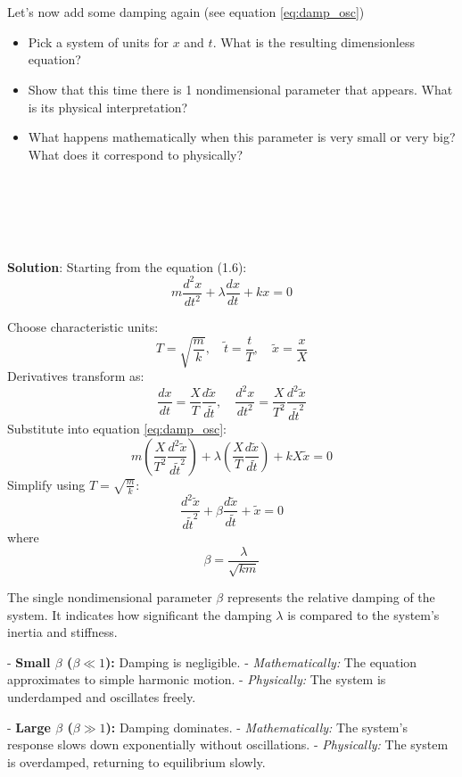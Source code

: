 \\
\\
 Let's now add some damping again (see equation \ref{eq:damp_osc})
\begin{itemize}
    \item Pick a system of units for $x$ and $t$. What is the resulting dimensionless equation? 
    \item Show that this time there is 1 nondimensional parameter that appears. What is its physical interpretation?
    \item What happens mathematically when this parameter is very small or very big? What  does it correspond to physically?
\end{itemize}
\\
\\
\\
\\
{\color{red} {\bf Solution}:
Starting from the equation (1.6):
\begin{equation}
    m \frac{d^2 x}{dt^2} + \lambda \frac{dx}{dt} + k x = 0 \label{eq:damp_osc}
\end{equation}

Choose characteristic units:
\[
    T = \sqrt{\frac{m}{k}}, \quad \tilde{t} = \frac{t}{T}, \quad \tilde{x} = \frac{x}{X}
\]
Derivatives transform as:
\[
    \frac{dx}{dt} = \frac{X}{T} \frac{d\tilde{x}}{d\tilde{t}}, \quad \frac{d^2 x}{dt^2} = \frac{X}{T^2} \frac{d^2\tilde{x}}{d\tilde{t}^2}
\]
Substitute into equation \eqref{eq:damp_osc}:
\[
    m \left( \frac{X}{T^2} \frac{d^2\tilde{x}}{d\tilde{t}^2} \right) + \lambda \left( \frac{X}{T} \frac{d\tilde{x}}{d\tilde{t}} \right) + kX \tilde{x} = 0
\]
Simplify using $T = \sqrt{\frac{m}{k}}$:
\[
    \frac{d^2\tilde{x}}{d\tilde{t}^2} + \beta \frac{d\tilde{x}}{d\tilde{t}} + \tilde{x} = 0
\]
where
\[
    \beta = \frac{\lambda}{\sqrt{k m}}
\]

The single nondimensional parameter $\beta$ represents the relative damping of the system. It indicates how significant the damping $\lambda$ is compared to the system's inertia and stiffness.

- \textbf{Small $\beta$ ($\beta \ll 1$):} Damping is negligible.
  - \textit{Mathematically:} The equation approximates to simple harmonic motion.
  - \textit{Physically:} The system is underdamped and oscillates freely.

- \textbf{Large $\beta$ ($\beta \gg 1$):} Damping dominates.
  - \textit{Mathematically:} The system's response slows down exponentially without oscillations.
  - \textit{Physically:} The system is overdamped, returning to equilibrium slowly.
}
